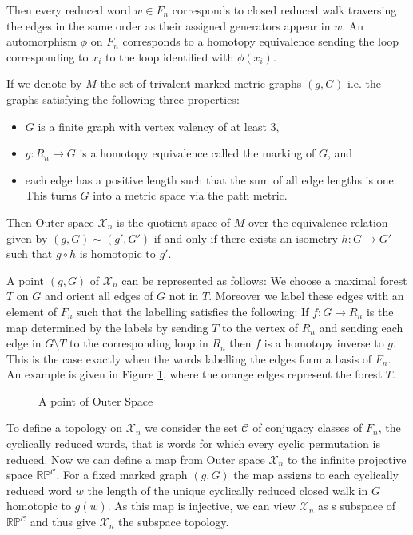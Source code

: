 Then every reduced word $w \in F_{n}$ corresponds to closed reduced walk traversing the edges in the same order as their assigned generators
appear in $w$.
An automorphism $\phi$ on $F_{n}$ corresponds to a homotopy equivalence sending the loop corresponding to $x_{i}$
to the loop identified with $\phi(x_{i})$.

If we denote by $M$ the set of trivalent marked metric graphs $(g,G)$ i.e. the graphs satisfying the following three properties:
\begin{itemize}
	\item $G$ is a finite graph with vertex valency of at least $3$,
	\item $g: R_{n} \to G$ is a homotopy equivalence called the marking of $G$, and
	\item each edge has a positive length such that the sum of all
		edge lengths is one. This turns $G$ into a metric space via the path metric.
\end{itemize}
Then Outer space $\mathcal{X}_{n}$ is the quotient space of $M$ over the equivalence relation given by $(g,G) \sim (g',G')$ if and only if 
there exists an isometry $h: G \to G'$ such that $g \circ h$ is homotopic to $g'$.

A point $(g,G)$ of $\mathcal{X}_{n}$ can be represented as follows:
We choose a maximal forest $T$ on $G$ and orient all edges of $G$ not in $T$.
Moreover we label these edges with an element of $F_{n}$ such that the labelling satisfies the following:
If $f: G \to R_{n}$ is the map determined by the labels by sending $T$ to the vertex of $R_{n}$ and sending
each edge in $G \setminus T$ to the corresponding loop in $R_{n}$ then $f$ is a homotopy inverse to $g$.
This is the case exactly when the words labelling the edges form a basis of $F_{n}$.
An example is given in Figure \ref{fig:pointOfXn}, where the orange edges represent the forest $T$.

\begin{figure}[ht]
	\centering
	\caption[skip=0pt]{A point of Outer Space}
	\label{fig:pointOfXn}
\end{figure}

To define a topology on $\mathcal{X}_{n}$ we consider the set $\mathcal{C}$ of conjugacy classes of $F_{n}$, the cyclically reduced words,
that is words for which every cyclic permutation is reduced.
Now we can define a map from Outer space $\mathcal{X}_{n}$ to the infinite projective space $\mathbb{RP}^{\mathcal{C}}$.
For a fixed marked graph $(g,G)$ the map assigns to each cyclically reduced word $w$ the length
of the unique cyclically reduced closed walk in $G$ homotopic to $g(w)$.
As this map is injective, we can view $\mathcal{X}_{n}$ as s subspace of $\mathbb{RP}^{\mathcal{C}}$ and thus
give $\mathcal{X}_{n}$ the subspace topology.

